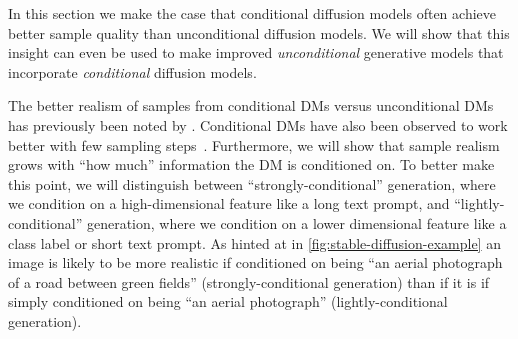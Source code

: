 

In this section we make the case that conditional diffusion models often achieve better sample quality than unconditional diffusion models. We will show that this insight can even be used to make improved \textit{unconditional} generative models that incorporate \textit{conditional} diffusion models.


The better realism of samples from conditional DMs versus unconditional DMs has previously been noted by \citet{ho2022classifier,bao2022conditional,hu2022self}. Conditional DMs have also been observed to work better with few sampling steps~\citep{meng2022distillation}. Furthermore, we will show that sample realism grows with ``how much'' information the DM is conditioned on. To better make this point, we will distinguish between ``strongly-conditional'' generation, where we condition on a high-dimensional feature like a long text prompt, and ``lightly-conditional'' generation, where we condition on a lower dimensional feature like a class label or short text prompt.  As hinted at in \cref{fig:stable-diffusion-example} an image is likely to be more realistic if conditioned on being ``an aerial photograph of a road between green fields'' (strongly-conditional generation) than if it is if simply conditioned on being ``an aerial photograph'' (lightly-conditional generation). 

